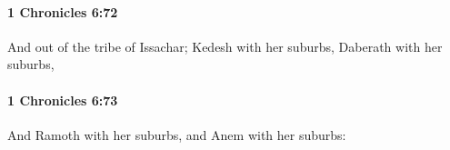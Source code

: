 		\paragraph{1 Chronicles 6:72} %
			\label{1CHRONICLES-6-72}

			And out of the tribe of Issachar; Kedesh with her suburbs, Daberath with her suburbs,


		\paragraph{1 Chronicles 6:73} %
			\label{1CHRONICLES-6-73}

			And Ramoth with her suburbs, and Anem with her suburbs:


